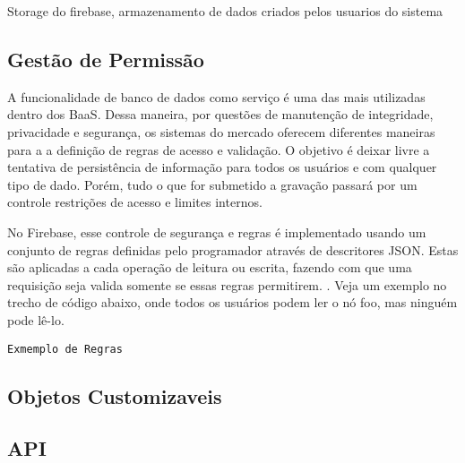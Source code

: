 	Storage do firebase, armazenamento de dados criados pelos usuarios do sistema

	\subsection{Gestão de Permissão} %
	\label{subsec:user_authorization}
	
	A funcionalidade de banco de dados como serviço é uma das mais utilizadas dentro dos BaaS. Dessa maneira, por questões de manutenção de integridade, privacidade e segurança, os sistemas do mercado oferecem diferentes maneiras para a a definição de regras de acesso e validação. O objetivo é deixar livre a tentativa de persistência de informação para todos os usuários e com qualquer tipo de dado. Porém, tudo o que for submetido a gravação passará por um controle restrições de acesso e limites internos.
	
	No Firebase, esse controle de segurança e regras é implementado usando um conjunto de regras definidas pelo programador através de descritores JSON. Estas são aplicadas a cada operação de leitura ou escrita, fazendo com que uma requisição seja valida somente se essas regras permitirem. \cite{https://firebase.google.com/docs/database/security/}. Veja um exemplo no trecho de código abaixo, onde todos os usuários podem ler o nó foo, mas ninguém pode lê-lo. 
	
	\begin{center}
 		\begin{minipage}{0.7\textwidth}
  			\begin{codigo}[H]
   				\small
   				\caption{\texttt{Exmemplo de Regras} }
   				\label{code:rules_example}
  			\end{codigo}
 		\end{minipage}
	\end{center}
	
	\subsection{Objetos Customizaveis}


	\subsection{API}


